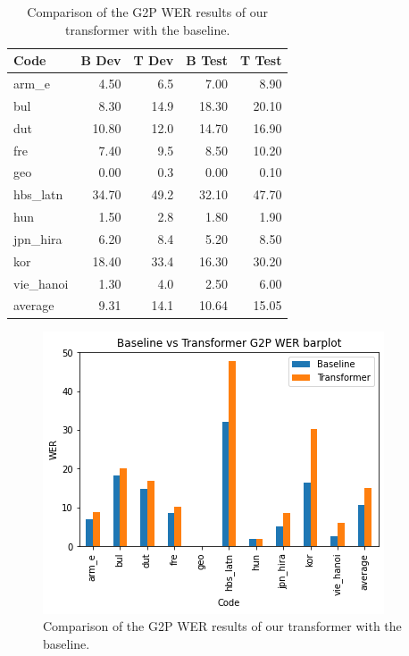 \documentclass[11pt,a4paper]{article}
\begin{document}
\begin{table}[ht]
\centering
\begin{tabular}{lrrrr}
\toprule
      Code &  B Dev &  T Dev &  B Test &  T Test \\
\midrule
     arm\_e &          4.50 &   6.5 &           7.00 &   8.90 \\
       bul &          8.30 &  14.9 &          18.30 &  20.10 \\
       dut &         10.80 &  12.0 &          14.70 &  16.90 \\
       fre &          7.40 &   9.5 &           8.50 &  10.20 \\
       geo &          0.00 &   0.3 &           0.00 &   0.10 \\
  hbs\_latn &         34.70 &  49.2 &          32.10 &  47.70 \\
       hun &          1.50 &   2.8 &           1.80 &   1.90 \\
  jpn\_hira &          6.20 &   8.4 &           5.20 &   8.50 \\
       kor &         18.40 &  33.4 &          16.30 &  30.20 \\
 vie\_hanoi &          1.30 &   4.0 &           2.50 &   6.00 \\
\midrule
   average &          9.31 &  14.1 &          10.64 &  15.05 \\
\bottomrule
\end{tabular}
\caption{Comparison of the G2P WER results of our transformer with the baseline.}
\label{tab:baseline}
\end{table}

\begin{figure}
    \centering
    \includegraphics[width=\linewidth]{g2p_baseline.png}
    \caption{Comparison of the G2P WER results of our transformer with the baseline.}
    \label{fig:g2p_baseline}
\end{figure}
\end{document}
